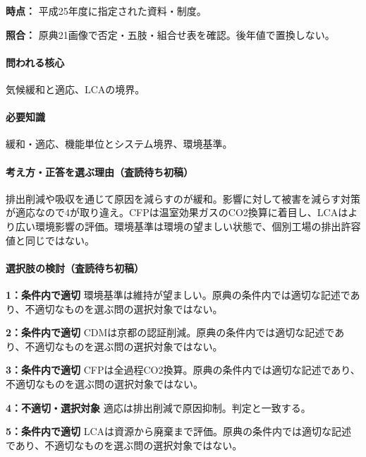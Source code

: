 \noindent\textbf{時点：} 平成25年度に指定された資料・制度。\par

\noindent\textbf{照合：} 原典21画像で否定・五肢・組合せ表を確認。後年値で置換しない。\par

\paragraph{問われる核心} 気候緩和と適応、LCAの境界。

\paragraph{必要知識} 緩和・適応、機能単位とシステム境界、環境基準。

\paragraph{考え方・正答を選ぶ理由（査読待ち初稿）} 排出削減や吸収を通じて原因を減らすのが緩和。影響に対して被害を減らす対策が適応なので4が取り違え。CFPは温室効果ガスのCO2換算に着目し、LCAはより広い環境影響の評価。環境基準は環境の望ましい状態で、個別工場の排出許容値と同じではない。

\paragraph{選択肢の検討（査読待ち初稿）}\mbox{}\par

\noindent\textbf{1：条件内で適切} 環境基準は維持が望ましい。原典の条件内では適切な記述であり、不適切なものを選ぶ問の選択対象ではない。\par

\noindent\textbf{2：条件内で適切} CDMは京都の認証削減。原典の条件内では適切な記述であり、不適切なものを選ぶ問の選択対象ではない。\par

\noindent\textbf{3：条件内で適切} CFPは全過程CO2換算。原典の条件内では適切な記述であり、不適切なものを選ぶ問の選択対象ではない。\par

\noindent\textbf{4：不適切・選択対象} 適応は排出削減で原因抑制。判定と一致する。\par

\noindent\textbf{5：条件内で適切} LCAは資源から廃棄まで評価。原典の条件内では適切な記述であり、不適切なものを選ぶ問の選択対象ではない。\par

